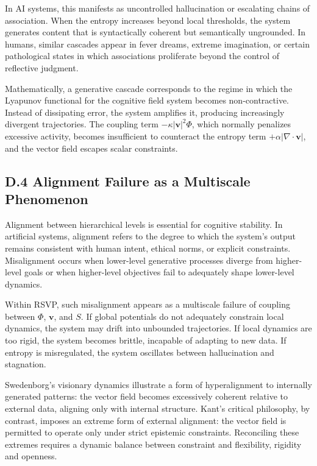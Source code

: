 \documentclass[12pt]{article}
\begin{document}
In AI systems, this manifests as uncontrolled hallucination or escalating 
chains of association. When the entropy increases beyond local thresholds, 
the system generates content that is syntactically coherent but semantically 
ungrounded. In humans, similar cascades appear in fever dreams, extreme 
imagination, or certain pathological states in which associations proliferate 
beyond the control of reflective judgment.

Mathematically, a generative cascade corresponds to the regime in which the 
Lyapunov functional for the cognitive field system becomes non-contractive.  
Instead of dissipating error, the system amplifies it, producing increasingly 
divergent trajectories. The coupling term $-\kappa|\mathbf{v}|^2 \Phi$, which 
normally penalizes excessive activity, becomes insufficient to counteract the 
entropy term $+\alpha|\nabla \cdot \mathbf{v}|$, and the vector field escapes 
scalar constraints.

\subsection*{D.4 Alignment Failure as a Multiscale Phenomenon}

Alignment between hierarchical levels is essential for cognitive stability.  
In artificial systems, alignment refers to the degree to which the system’s 
output remains consistent with human intent, ethical norms, or explicit 
constraints. Misalignment occurs when lower-level generative processes diverge 
from higher-level goals or when higher-level objectives fail to adequately 
shape lower-level dynamics.

Within RSVP, such misalignment appears as a multiscale failure of coupling 
between $\Phi$, $\mathbf{v}$, and $S$. If global potentials do not adequately 
constrain local dynamics, the system may drift into unbounded trajectories.  
If local dynamics are too rigid, the system becomes brittle, incapable of 
adapting to new data. If entropy is misregulated, the system oscillates 
between hallucination and stagnation.

Swedenborg’s visionary dynamics illustrate a form of hyperalignment to 
internally generated patterns: the vector field becomes excessively coherent 
relative to external data, aligning only with internal structure. Kant’s 
critical philosophy, by contrast, imposes an extreme form of external 
alignment: the vector field is permitted to operate only under strict 
epistemic constraints. Reconciling these extremes requires a dynamic balance 
between constraint and flexibility, rigidity and openness.
\end{document}
